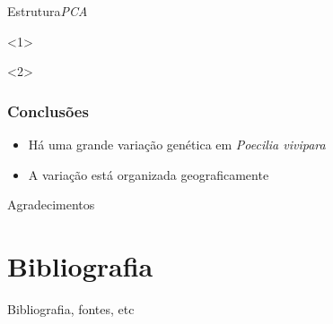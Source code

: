\documentclass{beamer}
\begin{document}
\begin{frame}{ Estrutura}{\textit{PCA}}

    \centering
      <1>

      <2>
\end{frame}

\begin{frame}
  \frametitle{Conclusões}

  \begin{itemize}[<+->]
\item Há uma grande varia\c{c}ão  genética em \textit{Poecilia vivipara}
\item A varia\c{c}ão está organizada geograficamente
\end{itemize}

 

\end{frame}



\begin{frame}{Agradecimentos}
  \centering

\end{frame}

\section*{Bibliografia}
\begin{frame}{Bibliografia, fontes, etc}
 \centering
\end{frame}
\end{document}
